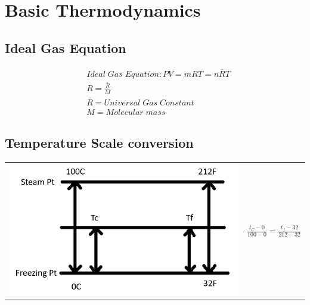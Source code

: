 \documentclass[12pt]{article}
\begin{document}
\section{Basic Thermodynamics}
	\subsection{Ideal Gas Equation}
		\begin{align*}
			&Ideal\;Gas\;Equation : PV = mRT = n\bar{R}T\\
			&R=\frac{\bar{R}}{M}\\
			&\bar{R} = Universal\;Gas\;Constant\\
			&M = Molecular\;mass
		\end{align*}

	\subsection{Temperature Scale conversion}
		\begin{table}[H]
			\centering
			\begin{tabular}{cc}	
				\parbox{5cm}{\includegraphics[scale=0.4]{TempScale.png}}& \parbox{3cm}{$\frac{t_C-0}{100-0}=\frac{t_f-32}{212-32}$}
			\end{tabular}
		\end{table}
				
			
\end{document}
